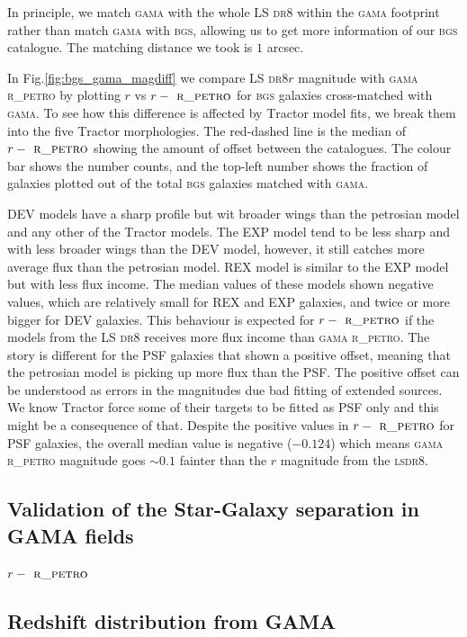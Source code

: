\documentclass[fleqn,usenatbib]{mnras}
\newcommand{\BGS}{\textsc{bgs}\xspace}
\newcommand{\DReight}{\textsc{dr8}\xspace}
\newcommand{\GAMA}{\textsc{gama}\xspace}
\newcommand{\LS}{\textsc{ls}\xspace}
\newcommand{\RPETRO}{{\textsc{ r\_petro}}\xspace}
\newcommand{\TRACTOR}{\textsc{T}ractor\xspace}
\begin{document}
In principle, we match \GAMA with the whole LS \DReight within the \GAMA footprint rather than match \GAMA with \BGS, allowing us to get more information of our \BGS catalogue. The matching distance we took is $1$ arcsec.

In Fig.\ref{fig:bgs_gama_magdiff} we compare LS \DReight $r$ magnitude with \GAMA \RPETRO by plotting $r$ vs $r-\RPETRO$ for \BGS galaxies cross-matched with \GAMA. To see how this difference is affected by \TRACTOR model fits, we break them into the five \TRACTOR morphologies. The red-dashed line is the median of $r-\RPETRO$ showing the amount of offset between the catalogues. The colour bar shows the number counts, and the top-left number shows the fraction of galaxies plotted out of the total \BGS galaxies matched with \GAMA. 

DEV models have a sharp profile but wit broader wings than the petrosian model and any other of the \TRACTOR models. The EXP model tend to be less sharp and with less broader wings than the DEV model, however, it still catches more average flux than the petrosian model. REX model is similar to the EXP model but with less flux income. The median values of these models shown negative values, which are relatively small for REX and EXP galaxies, and twice or more bigger for DEV galaxies. This behaviour is expected for $r-\RPETRO$ if the models from the LS \DReight receives more flux income than \GAMA \RPETRO. The story is different for the PSF galaxies that shown a positive offset, meaning that the petrosian model is picking up more flux than the PSF. The positive offset can be understood as errors in the magnitudes due bad fitting of extended sources. We know \TRACTOR force some of their targets to be fitted as PSF only and this might be a consequence of that. Despite the positive values in $r-\RPETRO$ for PSF galaxies, the overall median value is negative ($-0.124$) which means \GAMA \RPETRO magnitude goes $\sim 0.1$ fainter than the $r$ magnitude from the \LS \DReight. 


\subsection{Validation of the Star-Galaxy separation in GAMA fields}$r-\RPETRO$



\subsection{Redshift distribution from GAMA}
\end{document}

